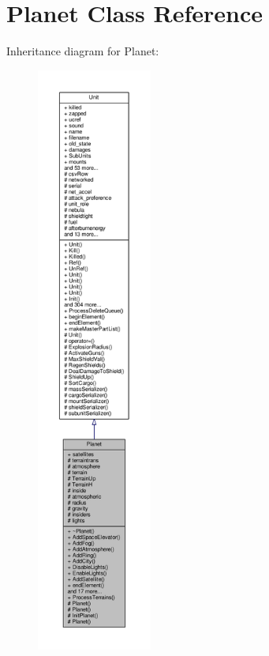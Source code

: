 \hypertarget{classPlanet}{}\section{Planet Class Reference}
\label{classPlanet}


Inheritance diagram for Planet\+:
\nopagebreak
\begin{figure}[H]
\begin{center}
\leavevmode
\includegraphics[height=550pt]{da/d5f/classPlanet__inherit__graph}
\end{center}
\end{figure}


